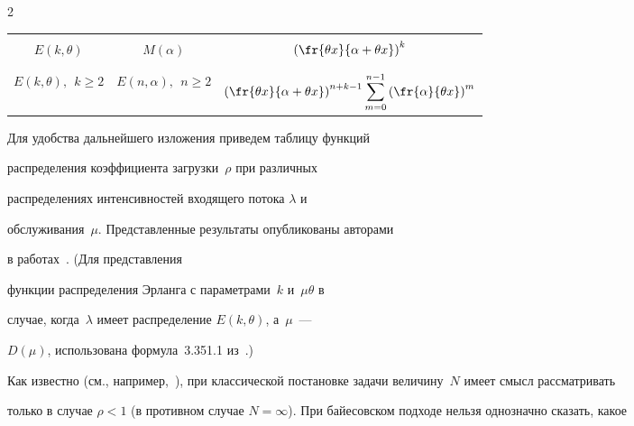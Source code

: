 \begin{multicols}{2}
\begin{table}
\begin{center}
\begin{tabular}{|c|c|c|}
&&\\[-9pt]


$E(k,\theta)$&$M(\alpha)$&$\left(\displaystyle\fr{\theta x}{\alpha+\theta x}\right)^k$\\


&&\\[-9pt]


\hline


&&\\[-9pt]


$E(k,\theta),\ \ k\ge2$&$E(n,\alpha),\ \ n\ge2$&$\left(\displaystyle\fr{\theta x}{\alpha+\theta x}\right)^{n+k-1}


\displaystyle\sum\limits_{m=0}^{n-1}\left(\displaystyle\fr{\alpha}{\theta x}\right)^m$\\[9pt]


\hline


\end{tabular}


\end{center}




\end{table}





Для удобства дальнейшего изложения приведем таблицу функций


распределения коэффициента загрузки~$\rho$ при различных


распределениях интенсивностей входящего потока $\lambda$ и


обслуживания~$\mu$. Представленные результаты опубликованы авторами


в работах~\cite{KuSh07, KuSh09a, KuSh09b}. (Для представления


функции распределения Эрланга с параметрами~$k$ и~$\mu\theta$ в


случае, когда~$\lambda$ имеет распределение $E(k,\theta)$, а~$\mu$~--- 


$D(\mu)$, использована формула~3.351.1 из~\cite{GR71}.)








Как известно (см., например,~\cite{BoPe95}), при классической постановке задачи величину~$N$ имеет смысл рассматривать


только в случае $\rho<1$ (в противном случае $N=\infty$). При байесовском подходе нельзя однозначно сказать, какое



\end{multicols}
